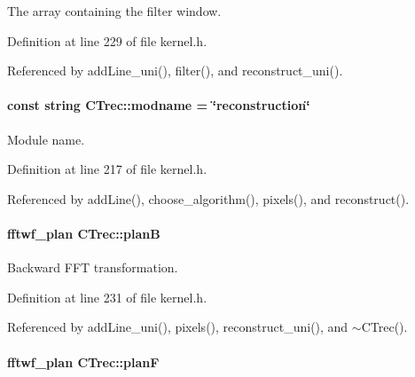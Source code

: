 The array containing the filter window. 



Definition at line 229 of file kernel.h.



Referenced by addLine\_\-uni(), filter(), and reconstruct\_\-uni().

\hypertarget{classCTrec_ad29b8e1dff3171ec14f60658204c8de5}{
\paragraph[{modname}]{\setlength{\rightskip}{0pt plus 5cm}const string {\bf CTrec::modname} = \char`\"{}reconstruction\char`\"{}}\hfill}
\label{classCTrec_ad29b8e1dff3171ec14f60658204c8de5}


Module name. 



Definition at line 217 of file kernel.h.



Referenced by addLine(), choose\_\-algorithm(), pixels(), and reconstruct().

\hypertarget{classCTrec_a963a0669b7a3c59119085639f660b154}{
\paragraph[{planB}]{\setlength{\rightskip}{0pt plus 5cm}fftwf\_\-plan {\bf CTrec::planB}}\hfill}
\label{classCTrec_a963a0669b7a3c59119085639f660b154}


Backward FFT transformation. 



Definition at line 231 of file kernel.h.



Referenced by addLine\_\-uni(), pixels(), reconstruct\_\-uni(), and $\sim$CTrec().

\hypertarget{classCTrec_a18670a29e97fab9f49e3a0060ddcd071}{
\paragraph[{planF}]{\setlength{\rightskip}{0pt plus 5cm}fftwf\_\-plan {\bf CTrec::planF}}\hfill}
\label{classCTrec_a18670a29e97fab9f49e3a0060ddcd071}


